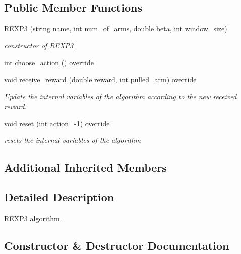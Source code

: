 \subsection*{Public Member Functions}
\begin{DoxyCompactItemize}
\item 
\mbox{\hyperlink{class_r_e_x_p3_a6b676721455094e28bea43920fa024e4}{R\+E\+X\+P3}} (string \mbox{\hyperlink{class_m_a_b_algorithm_a77b10ecc4b49d519c557f65358167b82}{name}}, int \mbox{\hyperlink{class_m_a_b_algorithm_a340fa9e83e85b092f2c6125fc4e8549b}{num\+\_\+of\+\_\+arms}}, double beta, int window\+\_\+size)
\begin{DoxyCompactList}\small\item\em constructor of \mbox{\hyperlink{class_r_e_x_p3}{R\+E\+X\+P3}} \end{DoxyCompactList}\item 
int \mbox{\hyperlink{class_r_e_x_p3_aba9cbcdc74602157701b022a7758d584}{choose\+\_\+action}} () override
\item 
void \mbox{\hyperlink{class_r_e_x_p3_a535d6667ecfa71568a68a5a09c44d4bf}{receive\+\_\+reward}} (double reward, int pulled\+\_\+arm) override
\begin{DoxyCompactList}\small\item\em Update the internal variables of the algorithm according to the new received reward. \end{DoxyCompactList}\item 
void \mbox{\hyperlink{class_r_e_x_p3_ad99a97c07f75addc64e612774de81307}{reset}} (int action=-\/1) override
\begin{DoxyCompactList}\small\item\em resets the internal variables of the algorithm \end{DoxyCompactList}\end{DoxyCompactItemize}
\subsection*{Additional Inherited Members}


\subsection{Detailed Description}
\mbox{\hyperlink{class_r_e_x_p3}{R\+E\+X\+P3}} algorithm. 

\subsection{Constructor \& Destructor Documentation}
\mbox{\label{class_r_e_x_p3_a6b676721455094e28bea43920fa024e4}} 
